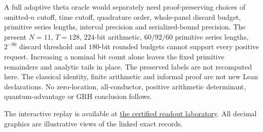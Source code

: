 \documentclass[11pt]{article}
\theoremstyle{definition}\newtheorem{definition}[theorem]{Definition}
\theoremstyle{remark}\newtheorem{remark}[theorem]{Remark}
\begin{document}
A full adaptive theta oracle would separately need proof-preserving choices
of omitted-$n$ cutoff, time cutoff, quadrature order, whole-panel discard
budget, primitive series lengths, interval precision and serialized-bound
precision. The present $N=11$, $T=128$, $224$-bit arithmetic,
$60/92/60$ primitive series lengths, $2^{-90}$ discard threshold and
$180$-bit rounded budgets cannot support every positive request.
Increasing a nominal bit count alone leaves the fixed primitive remainders
and analytic tails in place. The preserved labels are not recomputed here.
The classical identity, finite arithmetic and informal proof are not new
Lean declarations. No zero-location, all-conductor, positive arithmetic
determinant, quantum-advantage or GRH conclusion follows.

The interactive replay is available at \href{https://amelie-iska.github.io/GRH-research/readout.html}{the certified readout laboratory}. All decimal graphics are illustrative views of the linked exact records.
\end{document}
